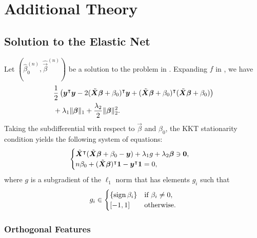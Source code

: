 \section{Additional Theory}
\label{sec:additional-theory}

\subsection{Solution to the Elastic Net}%
\label{sec:elastic-net-estimator}

Let \((\hat{\beta}_0^{(n)}, \hat{\vec{\beta}}^{(n)})\) be a solution to the problem in
. Expanding \(f\) in , we have
\[
  \begin{aligned}
     & \frac{1}{2}\left( \boldsymbol y^\intercal \boldsymbol y - 2(\tilde{\boldsymbol{X}}\boldsymbol{\beta} + \beta_0)^\intercal\boldsymbol{y} + (\tilde{\boldsymbol{X}}\boldsymbol{\beta} + \beta_0)^\intercal(\tilde{\boldsymbol{X}}\boldsymbol{\beta} + \beta_0)\right) \\
     & + \lambda_1 \lVert \boldsymbol\beta \rVert_1 + \frac{\lambda_2}{2}\lVert \boldsymbol \beta \rVert_2^2.
  \end{aligned}
\]
Taking the subdifferential with respect to \(\vec{\beta}\) and \(\beta_0\), the KKT
stationarity condition yields the following system of equations:
\begin{equation}
  \label{eq:kkt-elasticnet}
  \begin{cases}
    \tilde{\boldsymbol{X}}^\intercal(\tilde{\boldsymbol{X}}\boldsymbol{\beta} + \beta_0 - \boldsymbol{y}) + \lambda_1 g + \lambda_2 \boldsymbol\beta \ni \boldsymbol{0}, \\
    n \beta_0 + (\tilde{\boldsymbol{X}}\boldsymbol{\beta})^\intercal \boldsymbol{1} - \boldsymbol{y}^\intercal \boldsymbol{1} = 0,
  \end{cases}
\end{equation}
where \(g\) is a subgradient of the \(\ell_1\) norm that has elements \(g_i\) such that
\[
  g_i \in
  \begin{cases}
    \{\operatorname{sign}{\beta_i}\} & \text{if } \beta_i \neq 0, \\
    [-1, 1]            & \text{otherwise}.
  \end{cases}
\]

\subsubsection{Orthogonal Features}

